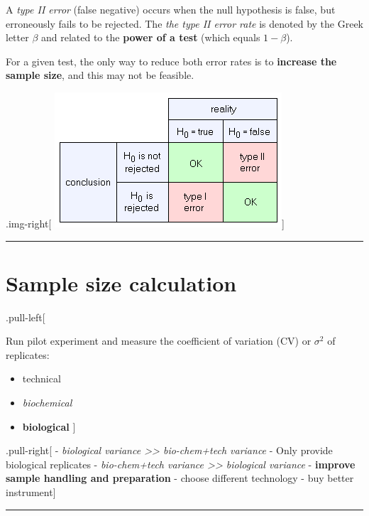 \documentclass[]{article}
\providecommand{\tightlist}{%
  \setlength{\itemsep}{0pt}\setlength{\parskip}{0pt}}
\begin{document}
A \emph{type II error} (false negative) occurs when the null hypothesis
is false, but erroneously fails to be rejected. The \emph{the type II
error rate} is denoted by the Greek letter \(\beta\) and related to the
\textbf{power of a test} (which equals \(1−\beta\)).

For a given test, the only way to reduce both error rates is to
\textbf{increase the sample size}, and this may not be feasible.

.img-right{[} \includegraphics{../inst/images/hl_nullhypo_errors.png}{]}

\begin{center}\rule{0.5\linewidth}{\linethickness}\end{center}

\hypertarget{sample-size-calculation}{%
\section{Sample size calculation}\label{sample-size-calculation}}

.pull-left{[}

Run pilot experiment and measure the coefficient of variation (CV) or
\(\sigma^2\) of replicates:

\begin{itemize}
\tightlist
\item
  technical
\item
  \emph{biochemical}
\item
  \textbf{biological} {]}
\end{itemize}

.pull-right{[} - \emph{biological variance \textgreater{}\textgreater{}
bio-chem+tech variance} - Only provide biological replicates -
\emph{bio-chem+tech variance \textgreater{}\textgreater{} biological
variance} - \textbf{improve sample handling and preparation} - choose
different technology - buy better instrument{]}

\begin{center}\rule{0.5\linewidth}{\linethickness}\end{center}
\end{document}
